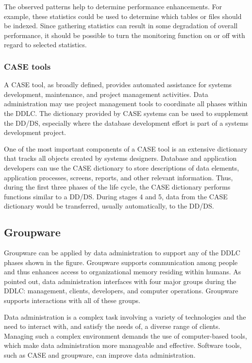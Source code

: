 \documentclass[
]{article}
\begin{document}
The observed patterns help to determine performance enhancements. For
example, these statistics could be used to determine which tables or
files should be indexed. Since gathering statistics can result in some
degradation of overall performance, it should be possible to turn the
monitoring function on or off with regard to selected statistics.

\hypertarget{case-tools}{%
\subsubsection*{CASE tools}\label{case-tools}}

A CASE tool, as broadly defined, provides automated assistance for
systems development, maintenance, and project management activities.
Data administration may use project management tools to coordinate all
phases within the DDLC. The dictionary provided by CASE systems can be
used to supplement the DD/DS, especially where the database development
effort is part of a systems development project.

One of the most important components of a CASE tool is an extensive
dictionary that tracks all objects created by systems designers.
Database and application developers can use the CASE dictionary to store
descriptions of data elements, application processes, screens, reports,
and other relevant information. Thus, during the first three phases of
the life cycle, the CASE dictionary performs functions similar to a
DD/DS. During stages 4 and 5, data from the CASE dictionary would be
transferred, usually automatically, to the DD/DS.

\hypertarget{groupware-1}{%
\subsection*{Groupware}\label{groupware-1}}

Groupware can be applied by data administration to support any of the
DDLC phases shown in the figure. Groupware supports communication among
people and thus enhances access to organizational memory residing within
humans. As pointed out, data administration interfaces with four major
groups during the DDLC: management, clients, developers, and computer
operations. Groupware supports interactions with all of these groups.

Data administration is a complex task involving a variety of
technologies and the need to interact with, and satisfy the needs of, a
diverse range of clients. Managing such a complex environment demands
the use of computer-based tools, which make data administration more
manageable and effective. Software tools, such as CASE and groupware,
can improve data administration.
\end{document}
